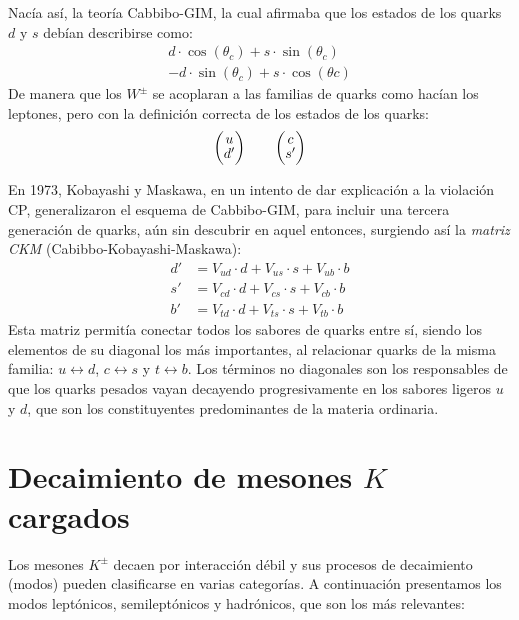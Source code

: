 Nacía así, la teoría Cabbibo-GIM, la cual afirmaba que los estados de los quarks $d$ y $s$ debían describirse como:
\begin{equation}
\begin{gathered}
d\cdot \cos \left( \theta _{c}\right) +s\cdot \sin \left( \theta _{c}\right) \\
-d\cdot \sin \left( \theta _{c}\right) +s\cdot \cos \left( \theta c\right)
\end{gathered}
\end{equation}
De manera que los $W^{\pm}$ se acoplaran a las familias de quarks como hacían los leptones, pero con la definición correcta de los estados de los quarks:
\begin{align}
\begingroup 
\renewcommand*{\arraystretch}{0.8}
\setlength\arraycolsep{10pt}
\begin{pmatrix} u \\ d' \end{pmatrix} \qquad
\begin{pmatrix} c \\ s' \end{pmatrix}
\endgroup
\end{align}

En 1973, Kobayashi y Maskawa, en un intento de dar explicación a la violación CP, generalizaron el esquema de Cabbibo-GIM, para incluir una tercera generación de quarks, aún sin descubrir en aquel entonces, surgiendo así la \textit{matriz CKM} (Cabibbo-Kobayashi-Maskawa):
\begin{align}
d' &= V_{ud}\cdot d+V_{us}\cdot s + V_{ub}\cdot b \nonumber \\
s' &= V_{cd}\cdot d+V_{cs}\cdot s + V_{cb}\cdot b \label{eq:CKM}\\
b' &= V_{td}\cdot d+V_{ts}\cdot s + V_{tb}\cdot b \nonumber
\end{align}
Esta matriz permitía conectar todos los sabores de quarks entre sí, siendo los elementos de su diagonal los más importantes, al relacionar quarks de la misma familia: $u\leftrightarrow d$, $c\leftrightarrow s$ y $t\leftrightarrow b$. Los términos no diagonales son los responsables de que los quarks pesados vayan decayendo progresivamente en los sabores ligeros $u$ y $d$, que son los constituyentes predominantes de la materia ordinaria. 

\section{Decaimiento de mesones $K$ cargados}
\label{sec:charged_kaon_decay}
Los mesones $K^{\pm}$ decaen por interacción débil y sus procesos de decaimiento (modos) pueden clasificarse en varias categorías. A continuación presentamos los modos leptónicos, semileptónicos y hadrónicos, que son los más relevantes:

